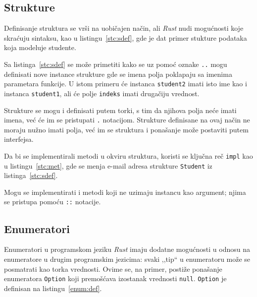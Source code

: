 \documentclass[12pt,oneside]{memoir}
\begin{document}


\subsection{Strukture}
Definisanje struktura se vrši na uobičajen način, ali \emph{Rust} nudi mogućnosti koje skraćuju
sintaksu, kao u listingu~\ref{stc:sdef}, gde je dat primer stukture podataka koja modeluje
studente.



Sa listinga~\ref{stc:sdef} se može primetiti kako se uz pomoć oznake \texttt{..} mogu definisati
nove instance strukture gde se imena
polja poklapaju sa imenima parametara funkcije. U istom primeru će instanca \texttt{student2}
imati isto ime kao i instanca \texttt{student1}, ali će polje \texttt{indeks} imati
drugačiju vrednost.

Strukture se mogu i definisati putem torki, s tim da njihova polja neće imati imena, već će
im se pristupati \texttt{.} notacijom. Strukture definisane na ovaj način ne moraju nužno imati
polja, već im se struktura i ponašanje može postaviti putem interfejsa.

Da bi se implementirali metodi u okviru struktura, koristi se ključna reč \texttt{impl} kao u
listingu~\ref{stc:met}, gde se menja e-mail adresa strukture \texttt{Student} iz
listinga~\ref{stc:sdef}.



\noindent
Mogu se implementirati i metodi koji ne uzimaju instancu kao argument; njima se pristupa pomoću
\texttt{::} notacije.

\subsection{Enumeratori}\label{subsec:enum}
Enumeratori u programskom jeziku \emph{Rust} imaju dodatne mogućnosti u odnosu na enumeratore u
drugim programskim jezicima: svaki ,,tip`` u enumeratoru može se posmatrati kao torka vrednosti.
Ovime se, na primer, postiže ponašanje enumeratora \texttt{Option} koji premošćava izostanak vrednosti
\texttt{null}. \texttt{Option} je definisan na listingu~\ref{enum:def}.
\end{document}
